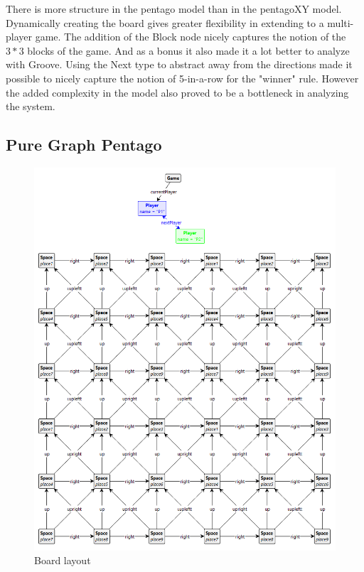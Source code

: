 \vspace{6pt}

There is more structure in the pentago model than in the pentagoXY model. Dynamically creating the board gives greater flexibility in extending to a multi-player game.
The addition of the Block node nicely captures the notion of the $3*3$ blocks of the game. And as a bonus it also made it a lot better to analyze with Groove.
Using the Next type to abstract away from the directions made it possible to nicely capture the notion of 5-in-a-row for the "winner" rule. However the added complexity in the model also proved to be a bottleneck in analyzing the system.

\subsection{Pure Graph Pentago}

\begin{figure}[!h]
    \centering
    \includegraphics[scale=0.25,clip]{Images/board1.png}
    \caption{Board layout}
    \label{fig:board1}
\end{figure}

